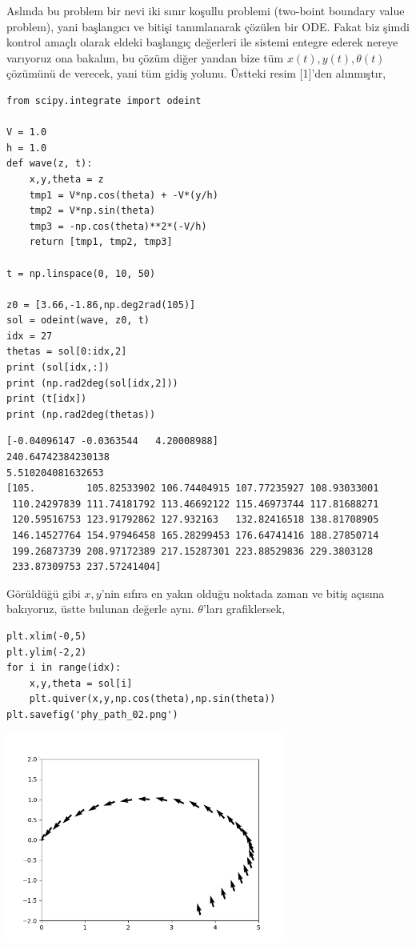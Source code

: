 \documentclass[12pt,fleqn]{article}\usepackage{../../common}
\begin{document}
Aslında bu problem bir nevi iki sınır koşullu problemi (two-boint boundary
value problem), yani başlangıcı ve bitişi tanımlanarak çözülen bir
ODE. Fakat biz şimdi kontrol amaçlı olarak eldeki başlangıç değerleri ile
sistemi entegre ederek nereye varıyoruz ona bakalım, bu çözüm diğer yandan
bize tüm $x(t),y(t),\theta(t)$ çözümünü de verecek, yani tüm gidiş
yolunu. Üstteki resim [1]'den alınmıştır,

\begin{verbatim}
from scipy.integrate import odeint

V = 1.0
h = 1.0
def wave(z, t):
    x,y,theta = z
    tmp1 = V*np.cos(theta) + -V*(y/h)
    tmp2 = V*np.sin(theta) 
    tmp3 = -np.cos(theta)**2*(-V/h)
    return [tmp1, tmp2, tmp3]

t = np.linspace(0, 10, 50)

z0 = [3.66,-1.86,np.deg2rad(105)]
sol = odeint(wave, z0, t)
idx = 27
thetas = sol[0:idx,2]
print (sol[idx,:])
print (np.rad2deg(sol[idx,2]))
print (t[idx])
print (np.rad2deg(thetas))
\end{verbatim}

\begin{verbatim}
[-0.04096147 -0.0363544   4.20008988]
240.64742384230138
5.510204081632653
[105.         105.82533902 106.74404915 107.77235927 108.93033001
 110.24297839 111.74181792 113.46692122 115.46973744 117.81688271
 120.59516753 123.91792862 127.932163   132.82416518 138.81708905
 146.14527764 154.97946458 165.28299453 176.64741416 188.27850714
 199.26873739 208.97172389 217.15287301 223.88529836 229.3803128
 233.87309753 237.57241404]
\end{verbatim}

Görüldüğü gibi $x,y$'nin sıfıra en yakın olduğu noktada zaman ve bitiş
açısına bakıyoruz, üstte bulunan değerle aynı. $\theta$'ları grafiklersek,

\begin{verbatim}
plt.xlim(-0,5)
plt.ylim(-2,2)
for i in range(idx):
    x,y,theta = sol[i]
    plt.quiver(x,y,np.cos(theta),np.sin(theta))
plt.savefig('phy_path_02.png')
\end{verbatim}

\includegraphics[width=25em]{phy_path_02.png}
\end{document}
